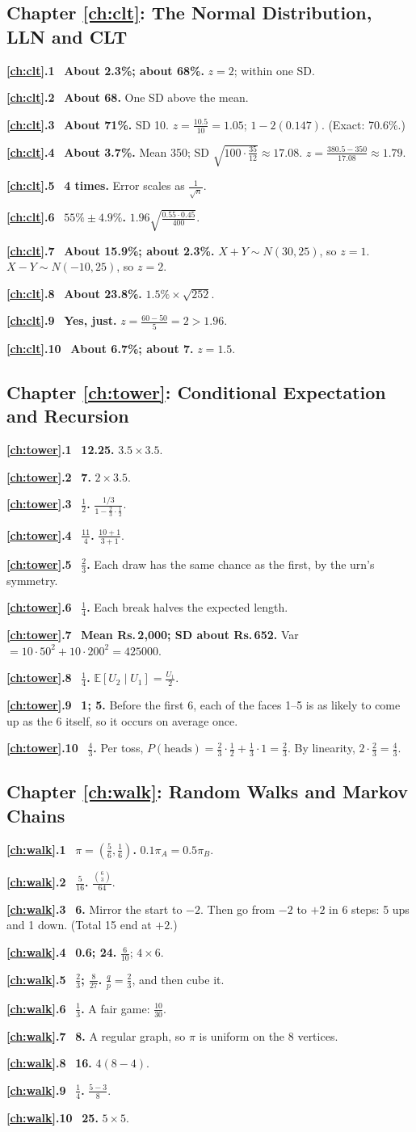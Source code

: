 \documentclass[11pt,a4paper,openany]{report}
\newcommand{\C}[2]{\binom{#1}{#2}}
\newcommand{\Rs}{Rs.\,}
\newcommand{\solchapter}[2]{\subsection*{Chapter \ref*{#1}: #2}\def\solprefix{\ref*{#1}}}
\newcommand{\sol}[1]{\par\smallskip\textbf{\solprefix.#1}\ }
\newcommand{\E}{\mathbb{E}}
\begin{document}
\solchapter{ch:clt}{The Normal Distribution, LLN and CLT}
\sol{1} \textbf{About 2.3\%; about 68\%.} $z=2$; within one SD.
\sol{2} \textbf{About 68.} One SD above the mean.
\sol{3} \textbf{About 71\%.} SD 10. $z=\frac{10.5}{10}=1.05$; $1-2(0.147)$. (Exact: 70.6\%.)
\sol{4} \textbf{About 3.7\%.} Mean 350; SD $\sqrt{100\cdot\frac{35}{12}}\approx17.08$. $z=\frac{380.5-350}{17.08}\approx1.79$.
\sol{5} \textbf{4 times.} Error scales as $\frac1{\sqrt n}$.
\sol{6} \textbf{$55\%\pm4.9\%$.} $1.96\sqrt{\frac{0.55\cdot0.45}{400}}$.
\sol{7} \textbf{About 15.9\%; about 2.3\%.} $X+Y\sim N(30,25)$, so $z=1$. $X-Y\sim N(-10,25)$, so $z=2$.
\sol{8} \textbf{About 23.8\%.} $1.5\%\times\sqrt{252}$.
\sol{9} \textbf{Yes, just.} $z=\frac{60-50}5=2>1.96$.
\sol{10} \textbf{About 6.7\%; about 7.} $z=1.5$.

\solchapter{ch:tower}{Conditional Expectation and Recursion}
\sol{1} \textbf{12.25.} $3.5\times3.5$.
\sol{2} \textbf{7.} $2\times3.5$.
\sol{3} \textbf{$\frac12$.} $\frac{1/3}{1-\frac23\cdot\frac12}$.
\sol{4} \textbf{$\frac{11}4$.} $\frac{10+1}{3+1}$.
\sol{5} \textbf{$\frac23$.} Each draw has the same chance as the first, by the urn's symmetry.
\sol{6} \textbf{$\frac14$.} Each break halves the expected length.
\sol{7} \textbf{Mean \Rs2,000; SD about \Rs652.} Var $=10\cdot50^2+10\cdot200^2=425000$.
\sol{8} \textbf{$\frac14$.} $\E[U_2\mid U_1]=\frac{U_1}2$.
\sol{9} \textbf{1; 5.} Before the first 6, each of the faces 1--5 is as likely to come up as the 6 itself, so it occurs on average once.
\sol{10} \textbf{$\frac43$.} Per toss, $P(\text{heads})=\frac23\cdot\frac12+\frac13\cdot1=\frac23$. By linearity, $2\cdot\frac23=\frac43$.

\solchapter{ch:walk}{Random Walks and Markov Chains}
\sol{1} \textbf{$\pi=\left(\frac56,\frac16\right)$.} $0.1\pi_A=0.5\pi_B$.
\sol{2} \textbf{$\frac5{16}$.} $\frac{\C63}{64}$.
\sol{3} \textbf{6.} Mirror the start to $-2$. Then go from $-2$ to $+2$ in 6 steps: 5 ups and 1 down. (Total 15 end at $+2$.)
\sol{4} \textbf{0.6; 24.} $\frac6{10}$; $4\times6$.
\sol{5} \textbf{$\frac23$; $\frac8{27}$.} $\frac qp=\frac23$, and then cube it.
\sol{6} \textbf{$\frac13$.} A fair game: $\frac{10}{30}$.
\sol{7} \textbf{8.} A regular graph, so $\pi$ is uniform on the 8 vertices.
\sol{8} \textbf{16.} $4(8-4)$.
\sol{9} \textbf{$\frac14$.} $\frac{5-3}{8}$.
\sol{10} \textbf{25.} $5\times5$.
\end{document}
